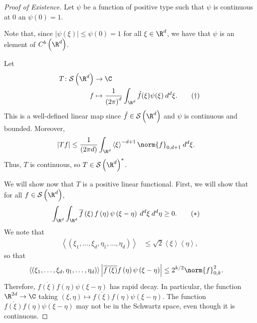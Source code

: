 \documentclass[10pt]{mypackage}
\begin{document}
\begin{proof}[Proof of Existence]
  Let $\psi$ be a function of positive type such that $\psi$ is continuous at $0$ an $\psi(0) = 1$.

  Note that, since $\left\vert \psi(\xi) \right\vert \leq \psi(0) = 1$ for all $\xi\in \R^d$, we have that $\psi$ is an element of $ C^b\left( \R^d \right) $.

  Let
  \begin{align*}
    T\colon \mathcal{S}\left( \R^d \right)&\to \C\\
    f &\mapsto \frac{1}{\left( 2\pi \right)^{d}}\int_{\R^d}^{} \hat{f}(\xi)\psi(\xi)\:d^{d}\xi.\label{eq:transformed_positive_type}\tag{$\dag$}
  \end{align*}
  This is a well-defined linear map since $\hat{f}\in \mathcal{S}\left( \R^d \right)$ and $\psi$ is continuous and bounded. Moreover,
  \begin{align*}
    \left\vert Tf \right\vert &\leq \frac{1}{\left( 2\pi d \right)} \int_{\R^d}^{} \left\langle \xi \right\rangle^{-d+1}\norm{f}_{0,d+1}\:d^{d}\xi.
  \end{align*}
  Thus, $T$ is continuous, so $T\in \mathcal{S}\left( \R^d \right)^{\ast}$.

  We will show now that $T$ is a positive linear functional. First, we will show that for all $f\in \mathcal{S}\left( \R^d \right)$,
  \begin{align*}
    \int_{\R^d}^{} \int_{\R^d}^{} \overline{f}\left( \xi \right) f\left( \eta \right)\psi\left( \xi-\eta \right)\:d^{d}\xi\:d^{d}\eta &\geq 0.\label{eq:double_integral_positive_type}\tag{$\ast$}
  \end{align*}
  We note that
  \begin{align*}
    \left\langle \left( \xi_1,\dots,\xi_d,\eta_1,\dots,\eta_d \right) \right\rangle &\leq \sqrt{2} \left\langle \xi \right\rangle \left\langle \eta \right\rangle,
  \end{align*}
  so that
  \begin{align*}
    \left\langle \left( \xi_1,\dots,\xi_d,\eta_1,\dots,\eta_d \right) \right\rangle \left\vert \overline{f\left( \xi \right)} f\left( \eta \right) \psi\left( \xi-\eta \right) \right\vert &\leq 2^{k/2} \norm{f}_{0,k}^2.
  \end{align*}
  Therefore, $ \overline{f\left( \xi \right)}f\left( \eta \right)\psi\left( \xi-\eta \right) $ has rapid decay. In particular, the function $\R^{2d}\to \C$ taking $\left( \xi,\eta \right)\mapsto \overline{f\left( \xi \right)}f\left( \eta \right) \psi\left( \xi-\eta \right)$. The function $ \overline{f\left( \xi \right)}f\left( \eta \right)\psi\left( \xi-\eta \right) $ may not be in the Schwartz space, even though it is continuous.


\end{proof}
\end{document}
